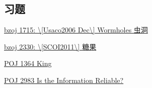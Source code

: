 \subsection{习题}

\href{https://www.lydsy.com/JudgeOnline/problem.php?id=1715}{ bzoj 1715: \textbackslash{}[Usaco2006 Dec\textbackslash{}] Wormholes 虫洞 } 

\href{https://www.lydsy.com/JudgeOnline/problem.php?id=2330}{ bzoj 2330: \textbackslash{}[SCOI2011\textbackslash{}] 糖果 }

\href{http://poj.org/problem?id=1364}{ POJ 1364 King }

\href{http://poj.org/problem?id=2983}{ POJ 2983 Is the Information Reliable? }
